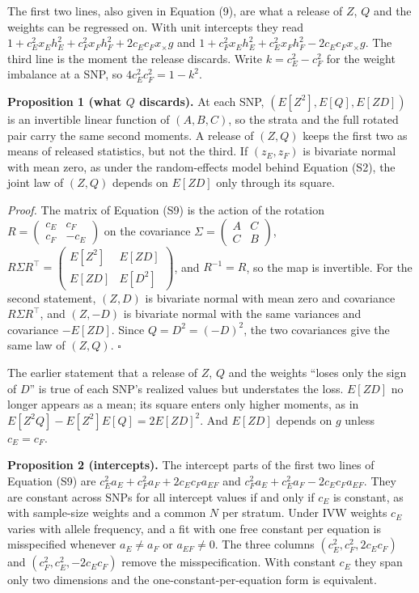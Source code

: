 \documentclass[11pt,a4paper]{article}
\begin{document}
The first two lines, also given in Equation (9), are what a release of \(Z\), \(Q\) and the weights can be regressed on. With unit intercepts they read \(1+c_E^2x_Eh_E^2+c_F^2x_Fh_F^2+2c_Ec_Fx_\times g\) and \(1+c_F^2x_Eh_E^2+c_E^2x_Fh_F^2-2c_Ec_Fx_\times g\). The third line is the moment the release discards. Write \(k=c_E^2-c_F^2\) for the weight imbalance at a SNP, so \(4c_E^2c_F^2=1-k^2\).

\textbf{Proposition 1 (what \(Q\) discards).} At each SNP, \((E[Z^2],E[Q],E[ZD])\) is an invertible linear function of \((A,B,C)\), so the strata and the full rotated pair carry the same second moments. A release of \((Z,Q)\) keeps the first two as means of released statistics, but not the third. If \((z_E,z_F)\) is bivariate normal with mean zero, as under the random-effects model behind Equation (S2), the joint law of \((Z,Q)\) depends on \(E[ZD]\) only through its square.

\emph{Proof.} The matrix of Equation (S9) is the action of the rotation \(R=\begin{pmatrix}c_E&c_F\\c_F&-c_E\end{pmatrix}\) on the covariance \(\Sigma=\begin{pmatrix}A&C\\C&B\end{pmatrix}\), \(R\Sigma R^\top=\begin{pmatrix}E[Z^2]&E[ZD]\\E[ZD]&E[D^2]\end{pmatrix}\), and \(R^{-1}=R\), so the map is invertible. For the second statement, \((Z,D)\) is bivariate normal with mean zero and covariance \(R\Sigma R^\top\), and \((Z,-D)\) is bivariate normal with the same variances and covariance \(-E[ZD]\). Since \(Q=D^2=(-D)^2\), the two covariances give the same law of \((Z,Q)\). \(\square\)

The earlier statement that a release of \(Z\), \(Q\) and the weights ``loses only the sign of \(D\)'' is true of each SNP's realized values but understates the loss. \(E[ZD]\) no longer appears as a mean; its square enters only higher moments, as in \(E[Z^2Q]-E[Z^2]E[Q]=2E[ZD]^2\). And \(E[ZD]\) depends on \(g\) unless \(c_E=c_F\).

\textbf{Proposition 2 (intercepts).} The intercept parts of the first two lines of Equation (S9) are \(c_E^2a_E+c_F^2a_F+2c_Ec_Fa_{EF}\) and \(c_F^2a_E+c_E^2a_F-2c_Ec_Fa_{EF}\). They are constant across SNPs for all intercept values if and only if \(c_E\) is constant, as with sample-size weights and a common \(N\) per stratum. Under IVW weights \(c_E\) varies with allele frequency, and a fit with one free constant per equation is misspecified whenever \(a_E\neq a_F\) or \(a_{EF}\neq0\). The three columns \((c_E^2,c_F^2,2c_Ec_F)\) and \((c_F^2,c_E^2,-2c_Ec_F)\) remove the misspecification. With constant \(c_E\) they span only two dimensions and the one-constant-per-equation form is equivalent.
\end{document}
